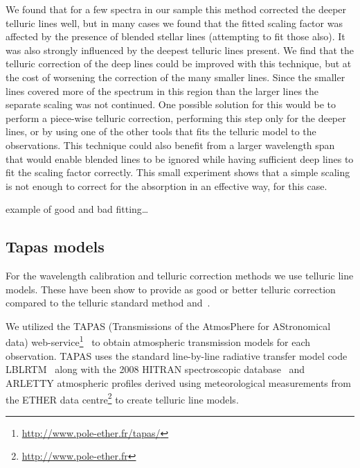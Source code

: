 We found that for a few spectra in our sample this method corrected the deeper telluric lines well, but in many cases we found that the fitted scaling factor was affected by the presence of blended stellar lines (attempting to fit those also). It was also strongly influenced by the deepest   telluric lines present. We find that the telluric correction of the deep  lines could be improved with this technique, but at the cost of worsening the correction of the many smaller  lines. Since the smaller  lines covered more of the spectrum in this region than the larger lines the separate  scaling was not continued. One possible solution for this would be to perform a piece-wise telluric correction, performing this step only for the deeper  lines, or by using one of the other tools that fits the telluric model to the observations. This technique could also benefit from a larger wavelength span that would enable blended lines to be ignored while having sufficient deep  lines to fit the scaling factor correctly. This small experiment shows that a simple scaling is not enough to correct for the absorption in an effective way, for this case.



 example of good and bad fitting\ldots


\subsection{Tapas models}
\label{subsec:tapas_models_usage}
For the wavelength calibration and telluric correction methods we use telluric line models. These have been show to provide as good or better telluric correction compared to the telluric standard method and~\citep{ulmer-moll_telluric_2018}.

We utilized the {TAPAS} (Transmissions of the {AtmosPhere} for {AStronomical} data) web-service\footnote{\url{http://www.pole-ether.fr/tapas/}}~\citep{bertaux_tapas_2014} to obtain atmospheric transmission models for each observation. {TAPAS} uses the standard line-by-line radiative transfer model code {LBLRTM}~\citep{clough_linebyline_1995} along with the 2008 {HITRAN} spectroscopic database~\citep{rothman_hitran_2009} and {ARLETTY} atmospheric profiles derived using meteorological measurements from the {ETHER} data centre\footnote{\url{http://www.pole-ether.fr}} to create telluric line models.

